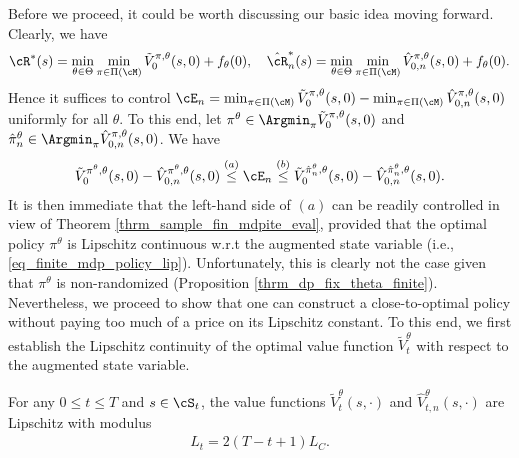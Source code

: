 \documentclass[9pt]{article}
\numberwithin{equation}{section}
\begin{document}
Before we proceed, it could be worth discussing our basic idea moving forward. 
Clearly, we have 
\begin{align*}
    \cR^*(s) = \min_{\theta \in \Theta} \min_{\pi \in \Pi(\cM)} \tilde{V}^{\pi, \theta}_0(s,0) + f_\theta(0), ~~~
    \hat{\cR}_n^*(s) = \min_{\theta \in \Theta} \min_{\pi \in \Pi(\cM)} \hat{V}^{\pi, \theta}_{0,n}(s,0) + f_\theta(0).
\end{align*}
Hence it suffices to control 
$
\cE_n = {\min_{\pi \in \Pi(\cM)} \tilde{V}^{\pi, \theta}_0(s,0) - \min_{\pi \in \Pi(\cM)} \hat{V}^{\pi, \theta}_{0,n}(s,0)}
$ uniformly for all $\theta$.
To this end, let $\pi^\theta \in \Argmin_{\pi} \tilde{V}^{\pi, \theta}_0(s,0)$
and $\hat{\pi}^\theta_n \in \Argmin_{\pi} \hat{V}^{\pi, \theta}_{0,n}(s,0) $.
We  have 
\begin{align}\label{ineq_policy_opt_mdp_basic}
     \tilde{V}^{\pi^\theta, \theta}_0(s,0) - \hat{V}^{\pi^\theta, \theta}_{0,n}(s,0) \overset{(a)}{\leq}  
    \cE_n \overset{(b)}{\leq}  \tilde{V}^{\hat{\pi}^\theta_n, \theta}_0(s,0) - \hat{V}^{\hat{\pi}^\theta_n, \theta}_{0,n}(s,0).
\end{align}
It is then immediate that the left-hand side of $(a)$ can be readily controlled in view of Theorem \ref{thrm_sample_fin_mdpite_eval}, provided that the optimal policy $\pi^\theta$ is Lipschitz continuous w.r.t the augmented state variable (i.e., \eqref{eq_finite_mdp_policy_lip}). 
Unfortunately, this is clearly not the case given that $\pi^\theta$ is non-randomized (Proposition  \ref{thrm_dp_fix_theta_finite}). 
Nevertheless, we proceed to show that one can construct a close-to-optimal policy without paying too much of a price on its Lipschitz constant. 
To this end, we first establish the Lipschitz continuity of the optimal value function  $\tilde{V}^\theta_t$
with respect to the augmented state variable.

\begin{lemma}{\label{lemma_fin_mdp_pol_opt_val_lip}
   For any $0 \leq t \leq T$ and $s \in \cS_t$, the value functions $\tilde{V}_t^\theta(s, \cdot)$ and $\hat{V}^\theta_{t,n}(s, \cdot)$ are Lipschitz with modulus
    \begin{align*}
         L_t = 2(T-t+1)L_C.
    \end{align*}
}    
\end{lemma}
\end{document}
